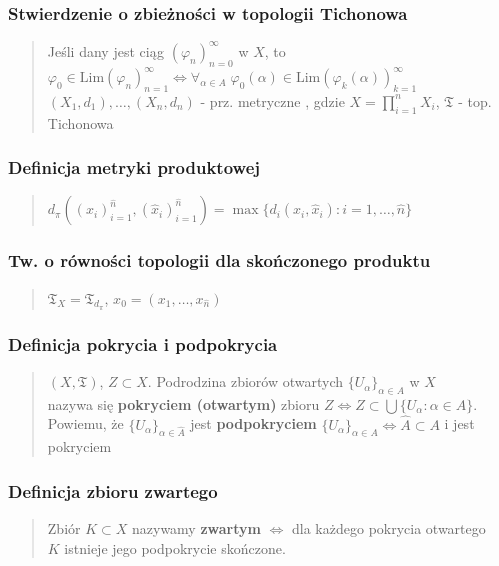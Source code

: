 \documentclass[10pt,a4paper]{article}
\begin{document}
    \subsubsection*{Stwierdzenie o zbieżności w topologii Tichonowa}
    \begin{quote}
    Jeśli dany jest ciąg $(\varphi_n)_{n=0}^\infty$ w $X$, to $\varphi_0 \in \mathrm{Lim} (\varphi_n)_{n=1}^\infty \iff \forall_{\alpha \in A} \; \varphi_0(\alpha) \in \mathrm{Lim} (\varphi_k(\alpha))_{k=1}^\infty$ \\
    $(X_1, d_1), \dots, (X_n, d_n)$ - prz. metryczne , gdzie $X = \prod_{i=1}^n X_i$, $\mathfrak{T}$ - top. Tichonowa
    \end{quote}

    \subsubsection*{Definicja metryki produktowej}
    \begin{quote}
    $d_\pi((x_i)_{i=1}^{\hat{n}}, (\hat{x}_i)_{i=1}^{\hat{n}}) = \max \{d_i(x_i, \hat{x}_i) : i=1, \dots, \hat{n}\}$ \\
    \end{quote}

    \subsubsection*{Tw. o równości topologii dla skończonego produktu}
    \begin{quote}
    $\mathfrak{T}_X = \mathfrak{T}_{d_\pi}$, $x_0 = (x_1, \dots, x_{\hat{n}})$
    \end{quote}

    \subsubsection*{Definicja pokrycia i podpokrycia}
    \begin{quote}
    $(X, \mathfrak{T})$, $Z \subset X$. Podrodzina zbiorów otwartych $\{U_\alpha\}_{\alpha \in A}$ w $X$ \\
    nazywa się \textbf{pokryciem (otwartym)} zbioru $Z \iff Z \subset \bigcup \{U_\alpha : \alpha \in A\}$. \\
    Powiemu, że $\{U_\alpha\}_{\alpha \in \hat{A}}$ jest \textbf{podpokryciem} $\{U_\alpha\}_{\alpha \in A} \iff \hat{A} \subset A$ i jest pokryciem
    \end{quote}

    \subsubsection*{Definicja zbioru zwartego}
    \begin{quote}
    Zbiór $K \subset X$ nazywamy \textbf{zwartym} $\iff$ dla każdego pokrycia otwartego \\
    $K$ istnieje jego podpokrycie skończone. 
    \end{quote}
\end{document}
